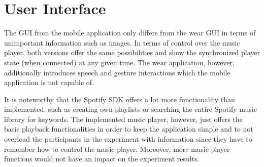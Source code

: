 \section{User Interface}\label{sec:UserInterface}
The \ac{GUI} from the mobile application only differs from the wear \ac{GUI} in terms of unimportant information such as images. In terms of control over the music player, both versions offer the same possibilities and show the synchronized player state (when connected) at any given time. The wear application, however, additionally introduces speech and gesture interactions which the mobile application is not capable of.

It is noteworthy that the Spotify \ac{SDK} offers a lot more functionality than implemented, such as creating own playlists or searching the entire Spotify music library for keywords. The implemented music player, however, just offers the basic playback functionalities in order to keep the application simple and to not overload the participants in the experiment with information since they have to remember how to control the music player. Moreover, more music player functions would not have an impact on the experiment results.

